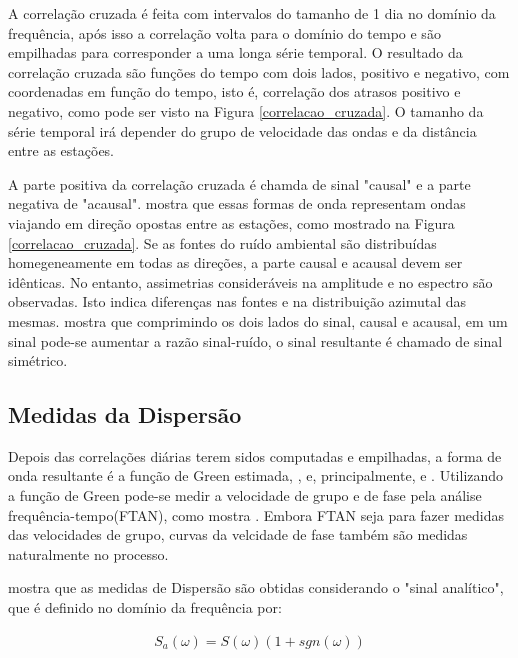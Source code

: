 A correlação cruzada é feita com intervalos do tamanho de 1 dia no domínio da frequência, após isso a correlação volta para o domínio do tempo e são empilhadas para corresponder a uma longa série temporal. 
O resultado da correlação cruzada são funções do tempo com dois lados, positivo e negativo, com coordenadas em função do tempo, isto é, correlação dos atrasos positivo e negativo, como pode ser visto na Figura \ref{correlacao_cruzada}. O tamanho da série temporal irá depender do grupo de velocidade das ondas e da distância entre as estações.

A parte positiva da correlação cruzada é chamda de sinal "causal" e a parte negativa de "acausal". \cite{bensen_processing_2007} mostra que essas formas de onda representam ondas viajando em direção opostas entre as estações, como mostrado na Figura \ref{correlacao_cruzada}. Se as fontes do ruído ambiental são distribuídas homegeneamente em todas as direções, a parte  causal e acausal devem ser idênticas. No entanto, assimetrias consideráveis na amplitude e no espectro são observadas. Isto indica diferenças nas fontes e na distribuição azimutal das mesmas. \cite{bensen_processing_2007} mostra que comprimindo os dois lados do sinal, causal e acausal, em um sinal pode-se aumentar a razão sinal-ruído, o sinal resultante é chamado de sinal simétrico.

\subsection{Medidas da Dispersão}

Depois das correlações diárias terem sidos computadas e empilhadas, a forma de onda resultante é a função de Green estimada, \cite{campillo_long-range_2003}, \cite{shapiro_emergence_2004} e, principalmente, \cite{wapenaar_retrieving_2004} e \cite{bensen_processing_2007}. Utilizando a função de Green pode-se medir a velocidade de grupo e de fase pela análise frequência-tempo(FTAN), como mostra \cite{levshin_automated_2001}. Embora FTAN seja para fazer medidas das velocidades de grupo, curvas da velcidade de fase também são medidas naturalmente no processo.

\cite{bensen_processing_2007} mostra que as medidas de Dispersão são obtidas considerando o "sinal analítico", que é definido no domínio da frequência por:

\begin{eqnarray}
S_{a}(\omega) = S(\omega)(1 + sgn(\omega))
\end{eqnarray}

